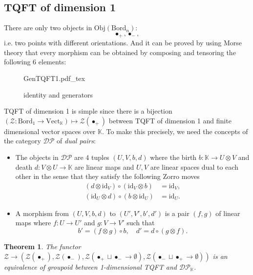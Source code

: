 \documentclass[10pt,reqno,final]{article}
\newcommand{\incfig}[1]{%
    \def\svgscale{0.38}
    {#1.pdf_tex}
}
\numberwithin{equation}{section}
\numberwithin{figure}{section}
\numberwithin{table}{section}
\theoremstyle{plain}
\newtheorem{theorem}{Theorem}[section]
\theoremstyle{definition}
\theoremstyle{remark}
\begin{document}
    \subsection{TQFT of dimension 1}\label{SSS:TQFTdim1}
    There are only two objects in \(\mathrm{Obj}(\mathrm{Bord}_{n})\):
    \begin{equation}
      \bullet_{+}, \bullet_{-},
    \end{equation}
    i.e. two points with different orientations. And it can be proved by using Morse theory that every morphism can be obtained by composing and tensoring the following 6 elements:
\begin{figure}[H]
  \centering
  \incfig{GenTQFT1}
  \caption{identity and generators}
  \label{fig:GenTQFT1}
\end{figure}

    TQFT of dimension 1 is simple since there is a bijection \((\mathcal{Z}:\mathrm{Bord}_{1}\to \mathrm{Vect}_{\mathbb{K}})\mapsto \mathcal{Z}(\bullet_{+})\) between TQFT of dimension 1 and finite dimensional vector spaces over \(\mathbb{K}\). To make this precisely, we need the concepts of the category \(\mathcal{DP}\) of \emph{dual pairs}:
    \begin{itemize}
        \item The objects in \(\mathcal{DP}\) are 4 tuples \((U,V,b,d)\) where the birth \(b:\mathbb{K}\to U\otimes V\) and death \(d:V\otimes U\to \mathbb{K}\) are linear maps and \(U,V \) are linear spaces dual to each other in the sense that they satisfy the following Zorro moves 
        \begin{equation}
          \begin{aligned}
            (d\otimes \mathrm{id}_{V })\circ(\mathrm{id}_{V}\otimes b )&=\mathrm{id}_{V }, \\
            (\mathrm{id}_{U}\otimes d )\circ(b\otimes \mathrm{id}_{U })&=\mathrm{id}_{U }.
          \end{aligned}
        \end{equation}
        \item A morphism from \((U,V,b,d)\) to \((U',V',b',d')\) is a pair \((f,g)\) of linear maps where \(f:U\to U'\) and \(g:V\to V'\) such that \[
          b'=(f\otimes g)\circ b, \quad d'=d\circ(g\otimes f).
        \]
    \end{itemize}
    \begin{theorem}
      The functor \(\mathcal{Z}\to (\mathcal{Z}(\bullet_{+}),\mathcal{Z}(\bullet_{-}),\mathcal{Z}(\bullet_{+}\sqcup\bullet_{-}\to \emptyset),\mathcal{Z}(\bullet_{-}\sqcup\bullet_{+}\to \emptyset))\) is an equivalence of groupoid between 1-dimensional TQFT and \(\mathcal{DP}_{\mathbb{K}}\).
    \end{theorem}
\end{document}
